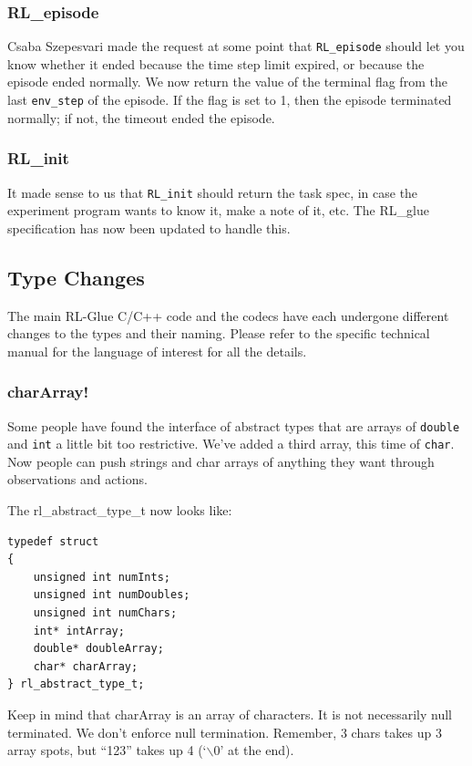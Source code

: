 \documentclass[11pt]{article}
\begin{document}
\subsubsection{RL\_episode}
Csaba Szepesvari made the request at some point that \texttt{RL\_episode} should let you know whether it ended because the time step limit expired, or because the episode ended normally.  We now return the value of the terminal flag from the last \texttt{env\_step} of the episode. If the flag is set to 1, then the episode terminated normally; if not, the timeout ended the episode.  

\subsubsection{RL\_init}
It made sense to us that \texttt{RL\_init} should return the task spec, in case the experiment program wants to know it, make a note of it, etc. The RL\_glue specification has now been updated to handle this.

\subsection{Type Changes}
The main RL-Glue C/C++ code and the codecs have each undergone different changes to the types and their naming.
Please refer to the specific technical manual for the language of interest for all the details.

\subsubsection{charArray!}
Some people have found the interface of abstract types that are arrays of \texttt{double} and \texttt{int} a little bit too restrictive.  We've added a third array, this time of \texttt{char}.  Now people can push strings and char arrays of anything they want through observations and actions.

The rl\_abstract\_type\_t now looks like:
\begin{verbatim}
typedef struct
{
    unsigned int numInts;
    unsigned int numDoubles;
    unsigned int numChars;
    int* intArray;
    double* doubleArray;
    char* charArray;
} rl_abstract_type_t;
\end{verbatim}

Keep in mind that charArray is an array of characters.  It is not necessarily null terminated.  We don't enforce null termination. Remember, 3 chars takes up 3 array spots, but ``123'' takes up 4 (`$\backslash$0' at the end).
\end{document}
